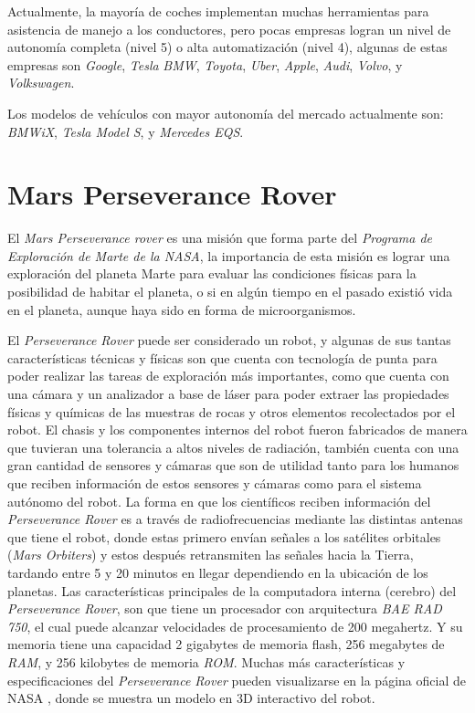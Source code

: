 \documentclass[a4paper, 12pt]{article}
\begin{document}
Actualmente, la mayoría de coches implementan muchas herramientas
para asistencia de manejo a los conductores, pero pocas empresas
logran un nivel de autonomía completa (nivel 5) o alta automatización
(nivel 4), algunas de estas empresas son \emph{Google}, \emph{Tesla}
\emph{BMW}, \emph{Toyota}, \emph{Uber}, \emph{Apple}, \emph{Audi},
\emph{Volvo}, y \emph{Volkswagen}.

Los modelos de vehículos con mayor autonomía del mercado actualmente son:
\emph{BMWiX}, \emph{Tesla Model S}, y \emph{Mercedes EQS}.

\section*{Mars Perseverance Rover}
El \emph{Mars Perseverance rover} es una misión que forma parte del
\emph{Programa de Exploración de Marte de la NASA}, la importancia de esta
misión es lograr una exploración del planeta Marte para evaluar las
condiciones físicas para la posibilidad de habitar el planeta, o si
en algún tiempo en el pasado existió vida en el planeta, aunque haya
sido en forma de microorganismos.

El \emph{Perseverance Rover} puede ser considerado un robot, y algunas
de sus tantas características técnicas y físicas son que cuenta con
tecnología de punta para poder realizar las tareas de exploración más
importantes, como que cuenta con una cámara y un analizador a base de
láser para poder extraer las propiedades físicas y químicas de las muestras
de rocas y otros elementos recolectados por el robot. El chasis y los
componentes internos del robot fueron fabricados de manera que tuvieran
una tolerancia a altos niveles de radiación, también cuenta con una gran
cantidad de sensores y cámaras que son de utilidad tanto para los humanos
que reciben información de estos sensores y cámaras como para el sistema
autónomo del robot. La forma en que los científicos reciben información del
\emph{Perseverance Rover} es a través de radiofrecuencias mediante las
distintas antenas que tiene el robot, donde estas primero envían señales a
los satélites orbitales (\emph{Mars Orbiters}) y estos después retransmiten
las señales hacia la Tierra, tardando entre 5 y 20 minutos en llegar
dependiendo en la ubicación de los planetas. Las características principales
de la computadora interna (cerebro) del \emph{Perseverance Rover}, son que
tiene un procesador con arquitectura \emph{BAE RAD 750}, el cual puede
alcanzar velocidades de procesamiento de 200 megahertz. Y su memoria tiene
una capacidad 2 gigabytes de memoria flash, 256 megabytes de \emph{RAM},
y 256 kilobytes de memoria \emph{ROM}.
Muchas más características y especificaciones del \emph{Perseverance Rover}
pueden visualizarse en la página oficial de NASA \cite{mars.nasa.gov_2020},
donde se muestra un modelo en 3D interactivo del robot.
\end{document}
